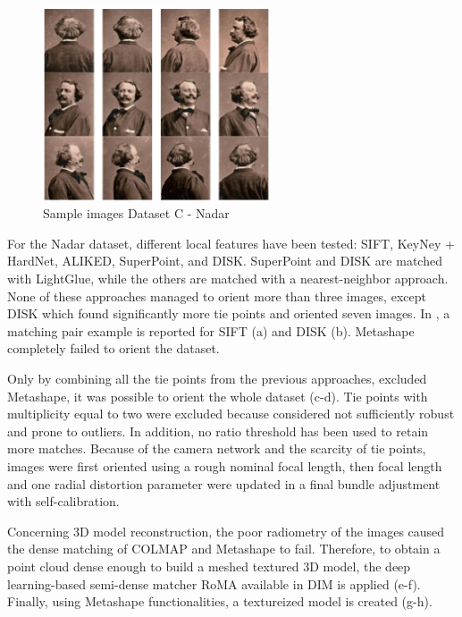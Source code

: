\begin{figure}
    \centering
    \includegraphics[width=0.6\textwidth]{nadar_images}
    \caption{Sample images Dataset C - Nadar}
    \label{fig:5:nadar_images}
\end{figure}

For the Nadar dataset, different local features have been tested: SIFT, KeyNey + HardNet, ALIKED, SuperPoint, and DISK.
SuperPoint and DISK are matched with LightGlue, while the others are matched with a nearest-neighbor approach. 
None of these approaches managed to orient more than three images, except DISK which found significantly more tie points and oriented seven images. 
In , a matching pair example is reported for SIFT (a) and DISK (b).
Metashape completely failed to orient the dataset. 

Only by combining all the tie points from the previous approaches, excluded Metashape, it was possible to orient the whole dataset (c-d). 
Tie points with multiplicity equal to two were excluded because considered not sufficiently robust and prone to outliers. 
In addition, no ratio threshold has been used to retain more matches. 
Because of the camera network and the scarcity of tie points, images were first oriented using a rough nominal focal length, then focal length and one radial distortion parameter were updated in a final bundle adjustment with self-calibration.

Concerning 3D model reconstruction, the poor radiometry of the images caused the dense matching of COLMAP and Metashape to fail. 
Therefore, to obtain a point cloud dense enough to build a meshed textured 3D model, the deep learning-based semi-dense matcher RoMA available in DIM is applied (e-f). 
Finally, using Metashape functionalities, a textureized model is created (g-h).

